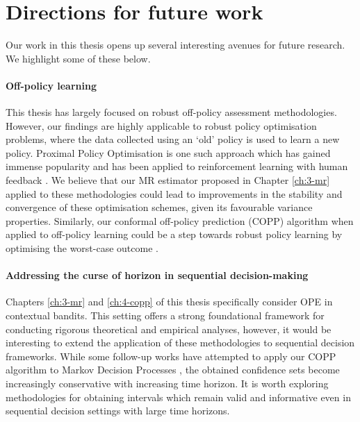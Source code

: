 \section{Directions for future work}
Our work in this thesis opens up several interesting avenues for future research. We highlight some of these below.

\paragraph*{Off-policy learning}
This thesis has largely focused on robust off-policy assessment methodologies. However, our findings are highly applicable to robust policy optimisation problems, where the data collected using an `old’ policy is used to learn a new policy. 
Proximal Policy Optimisation \citep{schulman2017proximal} is one such approach which has gained immense popularity and has been applied to reinforcement learning with human feedback \citep{lambert2022illustrating}. 
We believe that our MR estimator proposed in Chapter \ref*{ch:3-mr} applied to these methodologies could lead to improvements in the stability and convergence
of these optimisation schemes, given its favourable variance properties. 
Similarly, our conformal off-policy prediction (COPP) algorithm when applied to off-policy learning could be a
step towards robust policy learning by optimising the worst-case outcome \citep{stutz2021learning}.

\paragraph*{Addressing the curse of horizon in sequential decision-making}
Chapters \ref*{ch:3-mr} and \ref*{ch:4-copp} of this thesis specifically consider OPE in contextual bandits. 
This setting offers a strong foundational framework for conducting rigorous theoretical and empirical analyses, 
however, it would be interesting to extend the application of these methodologies to sequential decision frameworks.
While some follow-up works have attempted to apply our COPP algorithm to Markov Decision Processes \citep{foffano2023conformal, zhang2023conformal, kuipers2024conformal}, the obtained confidence sets become increasingly conservative with increasing time horizon. 
It is worth exploring methodologies for obtaining intervals which remain valid and informative even in sequential decision settings with large time horizons.  

%

